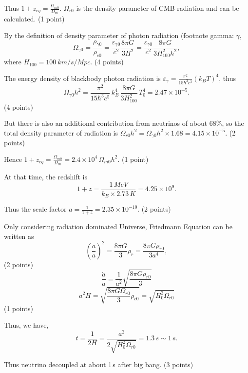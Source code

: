 \begin{description}
  Thus $1 + z_{eq} = \frac{\Omega_{m0}}{\Omega_{r0}}$. $\Omega_{r0}$ is
  the density parameter of CMB radiation and can be calculated.
  \hfill(1 point)

  By the definition of density parameter of photon radiation (footnote
  gamma: $\gamma$,
  \[ \Omega_{\gamma 0} = \frac{\rho_{\gamma 0}}{\rho_{c0}}
     = \frac{\varepsilon_{\gamma 0}}{c^2}\frac{8\pi G}{3H^2}
     = \frac{\varepsilon_{\gamma 0}}{c^2}
       \frac{8\pi G}{3H_{100}^2 h^2}, \]
  where $H_{100} = 100\ km/s/Mpc$. \hfill(4 points)

  The energy density of blackbody photon radiation is
  $\varepsilon_\gamma = \frac{\pi^2}{15\hbar^3 c^3}(k_B T)^4$, thus
  \[ \Omega_{\gamma 0}h^2 = \frac{\pi^2}{15\hbar^3 c^5}\,k_B^4\,
     \frac{8\pi G}{3H_{100}^2}\,T_0^4 = 2.47\times 10^{-5}. \]
  \hfill(4 points)

  But there is also an additional contribution from neutrinos of about
  68\%, so the total density parameter of radiation is
  $\Omega_{r0}h^2 = \Omega_{\gamma 0}h^2\times 1.68
   = 4.15\times 10^{-5}$. \hfill(2 points)

  Hence
  $1 + z_{eq} = \frac{\Omega_{m0}}{\Omega_{r0}}
   = 2.4\times 10^{4}\,\Omega_{m0}h^2$. \hfill(1 point)

\item[(j)] At that time, the redshift is
  \[ 1 + z = \frac{1\,MeV}{k_B\times 2.73\,K} = 4.25\times 10^{9}. \]

  Thus the scale factor
  $a = \frac{1}{1+z} = 2.35\times 10^{-10}$. \hfill(2 points)

  Only considering radiation dominated Universe, Friedmann Equation can be
  written as
  \[ \left(\frac{\dot{a}}{a}\right)^2 = \frac{8\pi G}{3}\rho_r
     = \frac{8\pi G\rho_{r0}}{3a^4}, \]
  \hfill(2 points)
  \[ \frac{\dot{a}}{a} = \frac{1}{a^2}\sqrt{\frac{8\pi G\rho_{r0}}{3}} \]
  \[ a^2 H = \sqrt{\frac{8\pi G\Omega_{r0}}{3}\rho_{c0}}
     = \sqrt{H_0^2\Omega_{r0}} \]
  \hfill(1 points)

  Thus, we have,
  \[ t = \frac{1}{2H} = \frac{a^2}{2\sqrt{H_0^2\Omega_{r0}}}
     = 1.3\,s \sim 1\,s. \]

  Thus neutrino decoupled at about 1\,s after big bang. \hfill(3 points)
\end{description}
